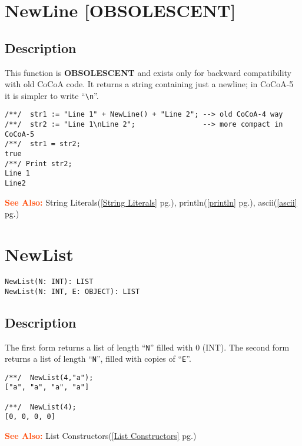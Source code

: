 \documentclass[a4paper]{mybook}
\newenvironment{command}{}{} %
\newcommand\SeeAlso{\par\textcolor{OrangeRed}{\textbf{\large See Also: }}}
\begin{document}
\section{NewLine [OBSOLESCENT]}
\label{NewLine [OBSOLESCENT]}
\begin{command} %



\subsection*{Description}

This function is \textbf{OBSOLESCENT} and exists only for backward
compatibility with old CoCoA code.
It returns a string containing just a newline; in CoCoA-5 it is
simpler to write ``\verb&\n&''.
\begin{Verbatim}[label=example, rulecolor=\color{PineGreen}, frame=single]
/**/  str1 := "Line 1" + NewLine() + "Line 2"; --> old CoCoA-4 way
/**/  str2 := "Line 1\nLine 2";                --> more compact in CoCoA-5
/**/  str1 = str2;
true
/**/ Print str2;
Line 1
Line2
\end{Verbatim}


\SeeAlso %
  String Literals(\ref{String Literals} pg.\pageref{String Literals}), 
    println(\ref{println} pg.\pageref{println}), 
    ascii(\ref{ascii} pg.\pageref{ascii})
\end{command} %

\section{NewList}
\label{NewList}
\begin{command} %


\begin{Verbatim}[label=syntax, rulecolor=\color{MidnightBlue},
frame=single]
NewList(N: INT): LIST
NewList(N: INT, E: OBJECT): LIST
\end{Verbatim}


\subsection*{Description}

The first form returns a list of length ``\verb&N&'' filled with 0 (INT).
The second form returns a list of length ``\verb&N&'', filled with copies of ``\verb&E&''.
\begin{Verbatim}[label=example, rulecolor=\color{PineGreen}, frame=single]
/**/  NewList(4,"a");
["a", "a", "a", "a"]

/**/  NewList(4);
[0, 0, 0, 0]
\end{Verbatim}


\SeeAlso %
  List Constructors(\ref{List Constructors} pg.\pageref{List Constructors})
\end{command} %
\end{document}
